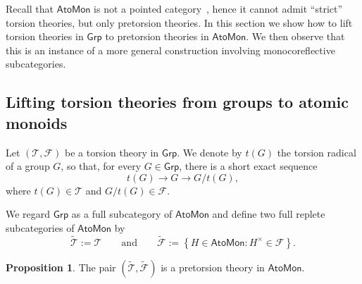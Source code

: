 \documentclass[a4paper,10pt,reqno]{amsart}
\theoremstyle{definition}
\newtheorem{proposition}[theorem]{Proposition}
\theoremstyle{remark}
\newcommand{\AtoMon}{\mathsf{AtoMon}}
\newcommand{\Grp}{\mathsf{Grp}}
\begin{document}
Recall that $\AtoMon$ is not a pointed category~\cite[Proposition~3.2]{CCT}, hence it cannot admit ``strict'' torsion theories, but only pretorsion theories. In this section we show how to lift torsion theories in $\Grp$ to pretorsion theories in $\AtoMon$. We then observe that this is an instance of a more general construction involving monocoreflective subcategories.

\subsection{Lifting torsion theories from groups to atomic monoids}\label{subsec:pretorsion_atomon}

Let $(\mathcal T,\mathcal F)$ be a torsion theory in $\Grp$. We denote by $t(G)$ the torsion radical of a group $G$, so that, for every $G\in\Grp$, there is a short exact sequence
$$
t(G)\to G\to G/t(G),
$$
where $t(G)\in\mathcal T$ and $G/t(G)\in\mathcal F$.

We regard $\Grp$ as a full subcategory of $\AtoMon$ and define two full
replete subcategories of $\AtoMon$ by
$$
\widetilde{\mathcal T}:=\mathcal T \qquad \text{and}\qquad \widetilde{\mathcal F}
:=
\left\{
H\in\AtoMon:H^\times\in\mathcal F
\right\}.
$$

\begin{proposition}\label{prop:lifting-torsion-theory}
The pair $(\widetilde{\mathcal T},\widetilde{\mathcal F})$ is a pretorsion theory in $\AtoMon$.
\end{proposition}
\end{document}
